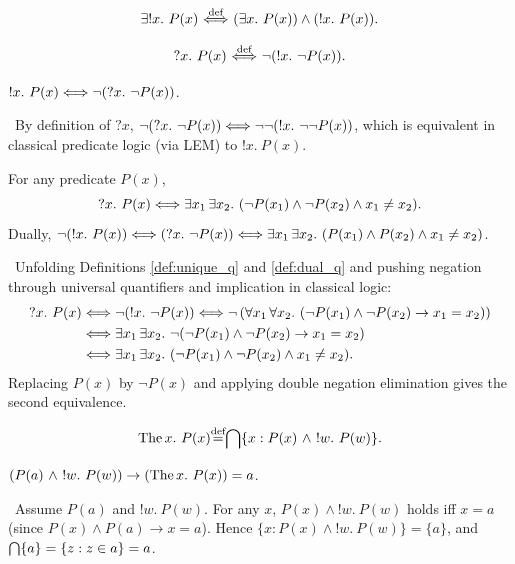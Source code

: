 \documentclass[10pt,a4paper]{article}
\begin{document}
\begin{definition}
$$\exists !x.\ P(x) \propdef (\exists x.\ P(x))\land(!x.\ P(x)).$$
\end{definition}

\begin{definition}\label{def:dual_q}
$$?x.\ P(x) {\stackrel{{\textrm{def}}}{\ \Longleftrightarrow\ }} \neg (!x.\ \neg P(x)).$$
\end{definition}

\begin{exercise}
$!x.\ P(x) \Longleftrightarrow \neg (?x.\ \neg P(x))$.
\end{exercise}
\myprf\ By definition of $?x$, $\neg (?x.\ \neg P(x)) \LRA \neg \neg (!x.\ \neg \neg P(x))$, which is equivalent in classical predicate logic (via LEM) to $!x.\ P(x)$. \myqed

\begin{lemma}
For any predicate $P(x)$,
$$?x.\ P(x) \LRA \exists x_1\, \exists x_2.\ (\neg P(x_1) \land \neg P(x_2) \land x_1 \neq x_2).$$
Dually, $\neg (!x.\ P(x)) \Longleftrightarrow (?x.\ \neg P(x)) \Longleftrightarrow \exists x_1\, \exists x_2.\ (P(x_1) \land P(x_2) \land x_1 \neq x_2)$.
\end{lemma}
\myprf\ Unfolding Definitions \ref{def:unique_q} and \ref{def:dual_q} and pushing negation through universal quantifiers and implication in classical logic:
\begin{align*}
?x.\ P(x) &\Longleftrightarrow \neg (!x.\ \neg P(x)) \Longleftrightarrow \neg \left(\forall x_1\, \forall x_2.\ (\neg P(x_1) \land \neg P(x_2) \to x_1 = x_2)\right) \\
&\Longleftrightarrow \exists x_1\, \exists x_2.\ \neg (\neg P(x_1) \land \neg P(x_2) \to x_1 = x_2) \\
&\Longleftrightarrow \exists x_1\, \exists x_2.\ (\neg P(x_1) \land \neg P(x_2) \land x_1 \neq x_2).
\end{align*}
Replacing $P(x)$ by $\neg P(x)$ and applying double negation elimination gives the second equivalence. \myqed

\begin{definition}
$$\The x.\ P(x) \eqdef \inter \{x : P(x)\ \land\ !w.\ P(w)\}.$$
\end{definition}

\begin{exercise}\label{ex:the_eq}
$(P(a)\ \land\ !w.\ P(w)) \to (\The x.\ P(x))=a$.
\end{exercise}
\myprf\ Assume $P(a)$ and $!w.\ P(w)$. For any $x$, $P(x) \land !w.\ P(w)$ holds iff $x = a$ (since $P(x) \land P(a) \to x=a$). Hence $\{x : P(x) \land !w.\ P(w)\} = \{a\}$, and ${\bigcap} \{a\} = \{z : z \in a\} = a$. \myqed
\end{document}
